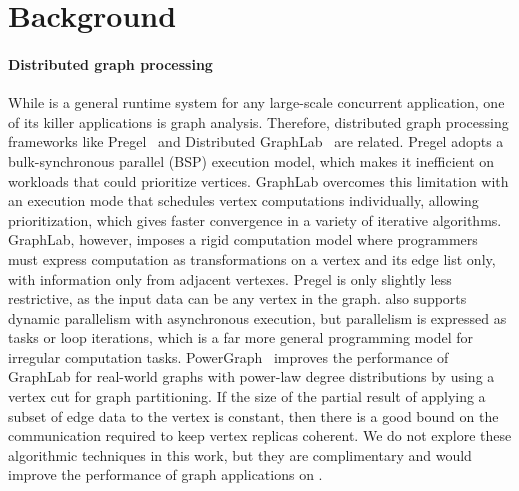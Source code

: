 \section{Background}



\paragraph{Distributed graph processing} While \Grappa is a general runtime
system for any large-scale concurrent application, one of its killer
applications is graph analysis. Therefore, distributed graph processing
frameworks like Pregel~\cite{pregel:2010} and Distributed
GraphLab~\cite{distgraphlab:vldb12} are related. Pregel adopts a
bulk-synchronous parallel (BSP) execution model, which makes it inefficient on
workloads that could prioritize vertices. GraphLab overcomes this limitation
with an execution mode that schedules vertex computations individually,
allowing prioritization, which gives faster convergence in a variety of
iterative algorithms. GraphLab, however, imposes a rigid computation model
where programmers must express computation as transformations on a vertex and
its edge list only, with information only from adjacent vertexes. Pregel is
only slightly less restrictive, as the input data can be any vertex in the
graph. \Grappa also supports dynamic parallelism with asynchronous execution,
but parallelism is expressed as tasks or loop iterations, which is a far more
general programming model for irregular computation tasks.
PowerGraph~\cite{powergraph:osdi12} improves the performance of GraphLab for
real-world graphs with power-law degree distributions by using a vertex cut
for graph partitioning. If the size of the partial result of applying a subset
of edge data to the vertex is constant, then there is a good bound on the
communication required to keep vertex replicas coherent. We do not explore
these algorithmic techniques in this work, but they are complimentary and
would improve the performance of graph applications on \Grappa.

